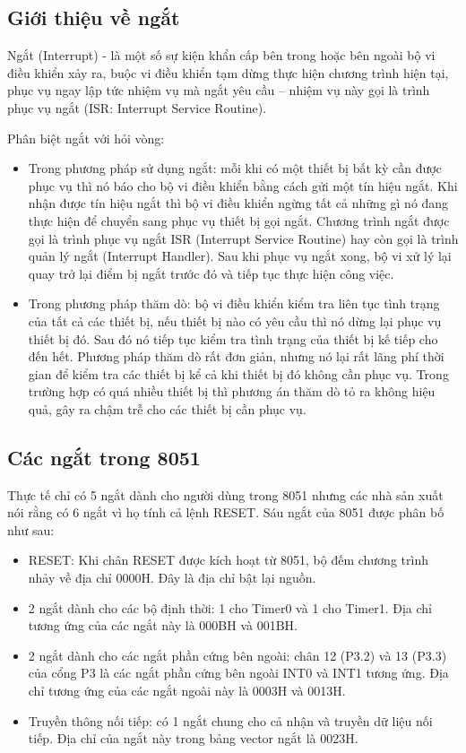 \documentclass[../report.tex]{subfiles}
\begin{document}
\subsection{Giới thiệu về ngắt}
Ngắt (Interrupt) - là một số sự kiện khẩn cấp bên trong hoặc bên ngoài bộ vi điều khiển xảy ra, 
buộc vi điều khiển tạm dừng thực hiện chương trình hiện tại, 
phục vụ ngay lập tức nhiệm vụ mà ngắt yêu cầu – nhiệm vụ này gọi là trình phục vụ ngắt (ISR: Interrupt Service Routine).

Phân biệt ngắt với hỏi vòng: 
\begin{itemize}
\item Trong phương pháp sử dụng ngắt: mỗi khi có một thiết bị bất kỳ cần 
được phục vụ thì nó báo cho bộ vi điều khiển bằng cách gửi một tín hiệu ngắt. 
Khi nhận được tín hiệu ngắt thì bộ vi điều khiển ngừng tất cả những gì nó 
đang thực hiện để chuyển sang phục vụ thiết bị gọi ngắt. 
Chương trình ngắt được gọi là trình phục vụ ngắt ISR (Interrupt Service Routine) 
hay còn gọi là trình quản lý ngắt (Interrupt Handler). 
Sau khi phục vụ ngắt xong, bộ vi xử lý lại quay trở lại 
điểm bị ngắt trước đó và tiếp tục thực hiện công việc.

\item Trong phương pháp thăm dò: bộ vi điều khiển kiểm tra liên tục tình trạng của tất cả các thiết bị, 
nếu thiết bị nào có yêu cầu thì nó dừng lại phục vụ thiết bị đó. 
Sau đó nó tiếp tục kiểm tra tình trạng của thiết bị kế tiếp cho đến hết. 
Phương pháp thăm dò rất đơn giản, nhưng nó lại rất lãng phí thời gian để kiểm tra các 
thiết bị kể cả khi thiết bị đó không cần phục vụ. 
Trong trường hợp có quá nhiều thiết bị thì phương án thăm dò tỏ ra không hiệu quả, 
gây ra chậm trễ cho các thiết bị cần phục vụ.
\end{itemize}

\subsection{Các ngắt trong 8051}
Thực tế chỉ có 5 ngắt dành cho người dùng trong 8051 nhưng các 
nhà sản xuất nói rằng có 6 ngắt vì họ tính cả lệnh RESET. 
Sáu ngắt của 8051 được phân bố như sau:
\begin{itemize}
\item RESET: Khi chân RESET được kích hoạt từ 8051, bộ đếm chương trình nhảy về địa chỉ 0000H.  Đây là địa chỉ bật lại nguồn.
\item 2 ngắt dành cho các bộ định thời: 1 cho Timer0 và 1 cho Timer1. Địa chỉ tương ứng của các ngắt này là 000BH và 001BH.
\item 2 ngắt dành cho các ngắt phần cứng bên ngoài: chân 12 (P3.2) và 13 (P3.3) của cổng P3 là các ngắt phần cứng bên ngoài INT0 và INT1 tương ứng. Địa chỉ tương ứng của các ngắt ngoài này là 0003H và 0013H.
\item Truyền thông nối tiếp: có 1 ngắt chung cho cả nhận và truyền dữ liệu nối tiếp. Địa chỉ của ngắt này trong bảng vector ngắt là 0023H.
\end{itemize}
\end{document}
